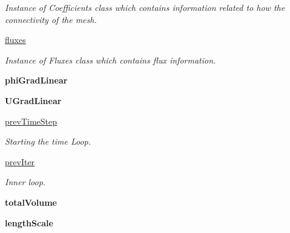 \begin{DoxyCompactItemize}
\begin{DoxyCompactList}\small\item\em Instance of Coefficients class which contains information related to how the connectivity of the mesh. \end{DoxyCompactList}\item 
\mbox{\label{classpy_f_v_m_1_1_region_1_1_region_a470eb7f9bb289ea6bec0123ef9e445c7}} 
\mbox{\hyperlink{classpy_f_v_m_1_1_region_1_1_region_a470eb7f9bb289ea6bec0123ef9e445c7}{fluxes}}
\begin{DoxyCompactList}\small\item\em Instance of Fluxes class which contains flux information. \end{DoxyCompactList}\item 
\mbox{\label{classpy_f_v_m_1_1_region_1_1_region_af61f7075862260a37e536e1b4c00f58b}} 
{\bfseries phi\+Grad\+Linear}
\item 
\mbox{\label{classpy_f_v_m_1_1_region_1_1_region_a28c26ee6d3c29442a69bc38ecea50951}} 
{\bfseries U\+Grad\+Linear}
\item 
\mbox{\label{classpy_f_v_m_1_1_region_1_1_region_a44d02ef0fc1fc27087f86cf6d79bfffe}} 
\mbox{\hyperlink{classpy_f_v_m_1_1_region_1_1_region_a44d02ef0fc1fc27087f86cf6d79bfffe}{prev\+Time\+Step}}
\begin{DoxyCompactList}\small\item\em Starting the time Loop. \end{DoxyCompactList}\item 
\mbox{\hyperlink{classpy_f_v_m_1_1_region_1_1_region_aab4dd6e5ae822364b6035fd27e44678a}{prev\+Iter}}
\begin{DoxyCompactList}\small\item\em Inner loop. \end{DoxyCompactList}\item 
\mbox{\label{classpy_f_v_m_1_1_region_1_1_region_ab92a475b4246bf3297fe7ab4a8283fca}} 
{\bfseries total\+Volume}
\item 
\mbox{\label{classpy_f_v_m_1_1_region_1_1_region_a6c67d59a18512ef5da7a5cfa48d4602d}} 
{\bfseries length\+Scale}
\end{DoxyCompactItemize}


